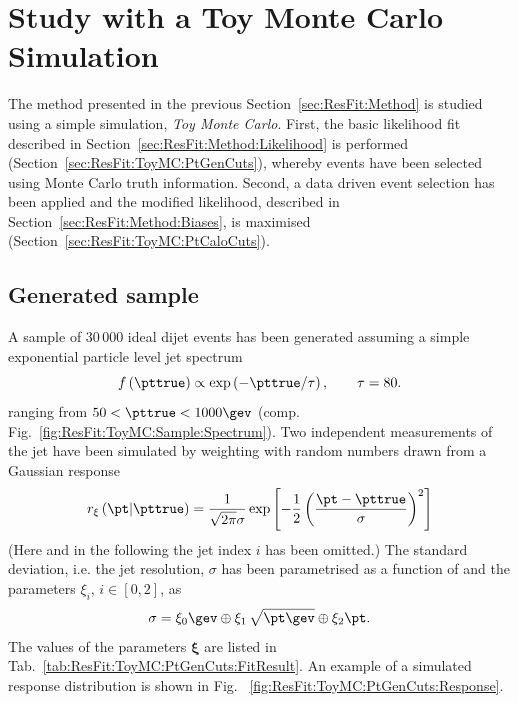 

\section{Study with a Toy Monte Carlo Simulation}\label{sec:ResFit:ToyMC}


The method presented in the previous Section~\ref{sec:ResFit:Method}
is studied using a simple simulation, \textit{Toy Monte Carlo}.
First, the basic likelihood fit described in
Section~\ref{sec:ResFit:Method:Likelihood} is performed (Section~\ref{sec:ResFit:ToyMC:PtGenCuts}),
whereby events have been selected using Monte Carlo truth information.
Second, a data driven event selection has been applied and the
modified likelihood, described in
Section~\ref{sec:ResFit:Method:Biases}, is maximised (Section~\ref{sec:ResFit:ToyMC:PtCaloCuts}).


\subsection{Generated sample}\label{sec:ResFit:ToyMC:Sample}

A sample of $30\,000$ ideal dijet events has been generated assuming a
simple exponential particle level jet \pt spectrum
\begin{equation}
  \label{eq:ResFit:ToyMC:Spectrum}
  f\left(\pttrue\right) \propto \exp\left(-\pttrue / \tau\right),
  \qquad \tau = 80.
\end{equation}
ranging from \mbox{$50 < \pttrue < 1000\gev$} (comp. Fig.~\ref{fig:ResFit:ToyMC:Sample:Spectrum}).
Two independent measurements of the jet \pt have been simulated by
weighting \pttrue with random numbers drawn from a Gaussian response
\begin{equation}
  \label{eq:ResFit:ToyMC:Response}
  r_{\mathbf{\xi}}\left(\pt|\pttrue\right) = 
  \frac{1}{\sqrt{2\pi}\sigma}\exp\left[-\frac{1}{2}\left(\frac{\pt - \pttrue}{\sigma}\right)^{2}\right]
\end{equation}
(Here and in the following the jet index $i$ has been omitted.)
The standard deviation, i.e. the jet resolution, $\sigma$ has been parametrised as a function of \pttrue and
the parameters $\xi_{i}$, \mbox{$i\in [0,2]$}, as
\begin{equation}
  \label{eq:ResFit:ToyMC:Sigma}
  \sigma = \xi_{0}\gev
  \oplus \xi_{1}\,\sqrt{\pt\gev}\oplus \xi_{2}\pt.
\end{equation}
The values of the parameters $\mathbf{\xi}$ are listed in
Tab.~\ref{tab:ResFit:ToyMC:PtGenCuts:FitResult}.
An example of a simulated response distribution is shown in Fig. ~\ref{fig:ResFit:ToyMC:PtGenCuts:Response}.

